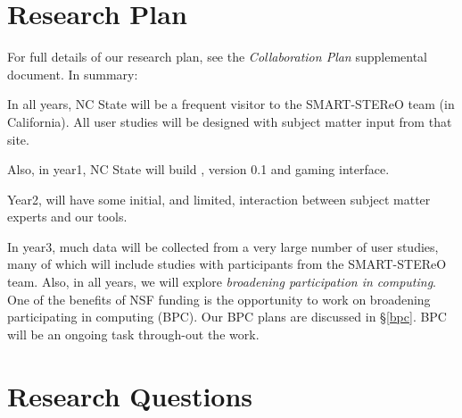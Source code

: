

\section{ Research     Plan}\label{rqplan}
For full details of our research plan,  see  the {\em Collaboration Plan} supplemental document. In summary:
\bi 
\item In all years, NC State will be a frequent visitor to the SMART-STEReO team (in California).
All user studies will be designed with subject matter input from that site.
\item 
Also, in year1, NC State will build {\IT}, version 0.1 and gaming interface. 
\item 
Year2, will have  some initial, and limited,   interaction between subject matter experts and our tools.
\item
In year3, much data will be collected from a very large number of user studies, many of which will include studies with participants from the  SMART-STEReO  team.\ei
Also, in all years, we will explore  {\em  broadening participation in computing}.
One  of the benefits of  NSF funding is the opportunity to work on  broadening participating in computing (BPC).  Our BPC plans are discussed in \S\ref{bpc}.  BPC will be an ongoing task through-out the work.




 \section{ Research Questions}\label{quest}

 


